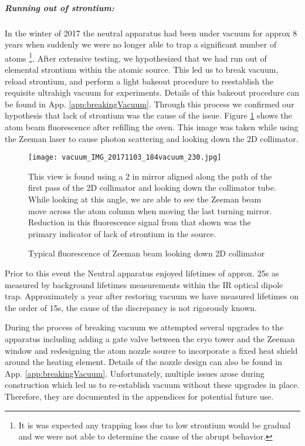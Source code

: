 \subparagraph{Running out of strontium:}
In the winter of 2017 the neutral apparatus had been under vacuum for approx 8 years when suddenly we were no longer able to trap a significant number of atoms \footnote{It is was expected any trapping loss due to low strontium would be gradual and we were not able to determine the cause of the abrupt behavior.}.
After extensive testing, we hypothesized that we had run out of elemental strontium within the atomic source.
This led us to break vacuum, reload strontium, and perform a light bakeout procedure to reestablish the requisite ultrahigh vacuum for experiments.
Details of this bakeout procedure can be found in App. \ref{app:breakingVacuum}. 
Through this process we confirmed our hypothesis that lack of strontium was the cause of the issue. 
Figure \ref{fig:2d_coll_flourescence} shows the atom beam fluorescence after refilling the oven.
This image was taken while using the Zeeman laser to cause photon scattering and looking down the 2D collimator.
	\begin{figure}
		\centerline{
		\texttt{[image: vacuum\_IMG\_20171103\_184vacuum\_230.jpg]}}
		\caption{Typical fluorescence of Zeeman beam looking down 2D collimator}{This view is found using a 2 in mirror aligned along the path of the first pass of the 2D collimator and looking down the collimator tube. While looking at this angle, we are able to see the Zeeman beam move across the atom column when moving the last turning mirror. Reduction in this fluorescence signal from that shown was the primary indicator of lack of strontium in the source.}
		\label{fig:2d_coll_flourescence}
	\end{figure}  
Prior to this event the Neutral apparatus enjoyed lifetimes of approx. 25s as measured by background lifetimes measurements within the IR optical dipole trap. 
Approximately a year after restoring vacuum we have measured lifetimes on the order of 15s, the cause of the discrepancy is not rigorously known.

During the process of breaking vacuum we attempted several upgrades to the apparatus including adding a gate valve between the cryo tower and the Zeeman window and redesigning the atom nozzle source to incorporate a fixed heat shield around the heating element. 
Details of the nozzle design can also be found in App. \ref{app:breakingVacuum}.
Unfortunately, multiple issues arose during construction which led us to re-establish vacuum without these upgrades in place.
Therefore, they are documented in the appendices for potential future use.

